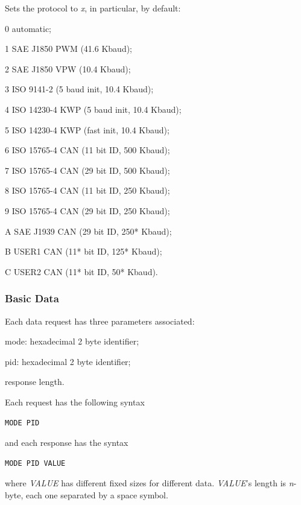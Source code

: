 \documentclass[twoside]{article}
\begin{document}
\begin{multicols}{2}
Sets the protocol to \emph{x}, in particular, by default:
\begin{compactitem}
  \item 0 automatic;
  \item 1 SAE J1850 PWM (41.6 Kbaud);
  \item 2 SAE J1850 VPW (10.4 Kbaud);
  \item 3 ISO 9141-2 (5 baud init, 10.4 Kbaud);
  \item 4 ISO 14230-4 KWP (5 baud init, 10.4 Kbaud);
  \item 5 ISO 14230-4 KWP (fast init, 10.4 Kbaud);
  \item 6 ISO 15765-4 CAN (11 bit ID, 500 Kbaud);
  \item 7 ISO 15765-4 CAN (29 bit ID, 500 Kbaud);
  \item 8 ISO 15765-4 CAN (11 bit ID, 250 Kbaud);
  \item 9 ISO 15765-4 CAN (29 bit ID, 250 Kbaud);
  \item A SAE J1939 CAN (29 bit ID, 250* Kbaud);
  \item B USER1 CAN (11* bit ID, 125* Kbaud);
  \item C USER2 CAN (11* bit ID, 50* Kbaud).
\end{compactitem}

\subsubsection{Basic Data}

Each data request has three parameters associated:
\begin{compactitem}
  \item mode: hexadecimal 2 byte identifier;
  \item pid: hexadecimal 2 byte identifier;
  \item response length.
\end{compactitem}

Each request has the following syntax
\begin{lstlisting}[language=bash]
MODE PID
\end{lstlisting}
and each response has the syntax
\begin{lstlisting}[language=bash]
MODE PID VALUE
\end{lstlisting}
where \emph{VALUE} has different fixed sizes for different data.
\emph{VALUE}'s length is \emph{n}-byte, each one separated by a space symbol.


\end{multicols}
\end{document}
